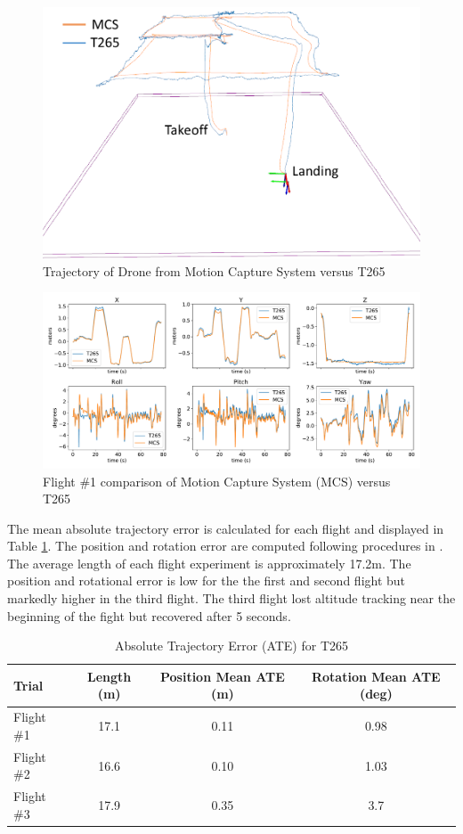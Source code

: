 \begin{figure}[!ht]
    \centering  
    \includegraphics[page=1,clip,trim=0cm 0cm 0cm 0cm,width=.45\linewidth]{chapter_7_experiments/imgs/flight_path_t265_mcs.pdf}
    \caption[Trajectory of Drone from Motion Capture System versus T265]{Trajectory of Drone from Motion Capture System versus T265}\label{fig:ch7_flight_path_3d}
\end{figure}

\begin{figure}[!ht]
    \centering  
    \includegraphics[page=1,clip,trim=0cm 0cm 0cm 0cm,width=.95\linewidth]{chapter_7_experiments/imgs/t265_gt_graphs_v2.pdf}
    \caption[Comparison of Motion Capture System versus T265]{Flight \#1 comparison of Motion Capture System (MCS) versus T265}\label{fig:ch7_t265}
\end{figure}
The mean absolute trajectory error is calculated for each flight and displayed in Table \ref{table:ch7_ate}. The position and rotation error are computed following procedures in \cite{zhang_tutorial_2018}. The average length of each flight experiment is approximately 17.2m. The position and rotational error is low for the the first and second flight but markedly higher in the third flight. The third flight lost altitude tracking near the beginning of the fight but recovered after 5 seconds.

\begin{table}[h]
\centering
\caption{Absolute Trajectory Error (ATE) for T265}\label{table:ch7_ate}
\begin{tabular}{@{}lccc@{}}
\toprule
Trial    & Length (m) & Position Mean ATE (m) & Rotation Mean ATE (deg) \\ \midrule
Flight \#1 & 17.1       & 0.11                  & 0.98                    \\
Flight \#2 & 16.6       & 0.10                  & 1.03                    \\
Flight \#3 & 17.9       & 0.35                  & 3.7                     \\ \bottomrule
\end{tabular}
\end{table}



